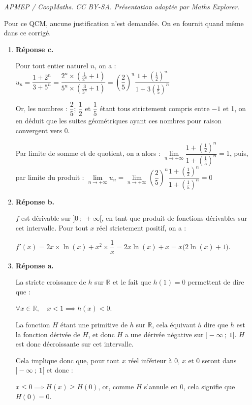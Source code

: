 \documentclass[10pt]{article}
\providecommand{\R}{\mathbb{R}}
\begin{document}
\noindent\textit{APMEP / CoopMaths. CC BY-SA. Présentation adaptée par Maths Explorer.}\par\medskip
\bigskip
Pour ce QCM, aucune justification n'est demandée. On en fournit quand même dans ce corrigé.
\begin{enumerate}
	\item \textbf{Réponse c.}

Pour tout entier naturel $n$, on a : $u_n = \dfrac{1 + 2^n}{3 + 5^n } = \dfrac{2^n \times \left(\frac{1}{2^n}+1\right)}{5^n\times \left(\frac{3}{5^n} + 1\right)  } = \left(\dfrac{2}{5}\right)^n \dfrac{1 + \left(\frac{1}{2}\right)^n}{1 + 3\left(\frac{1}{5}\right)^n}$

Or, les nombres : $ \dfrac{2}{5} $; $ \dfrac{1}{2} $ et $ \dfrac{1}{5} $ étant tous strictement compris entre $-1$ et 1, on en déduit que les suites géométriques ayant ces nombres pour raison convergent vers 0.

Par limite de somme et de quotient, on a alors : $ \lim\limits_{n \to +\infty} \dfrac{1 + \left(\frac{1}{2}\right)^n}{1 + \left(\frac{1}{5}\right)^n} = 1$, puis, par limite du produit : $\lim\limits_{n \to +\infty} u_n = \lim\limits_{n \to +\infty}  \left(\dfrac{2}{5}\right)^n \dfrac{1 + \left(\frac{1}{2}\right)^n}{1 + \left(\frac{1}{5}\right)^n}=0$

	\item \textbf{Réponse b.}

$f$ est dérivable sur $ ]0~;~+\infty[ $, en tant que produit de fonctions dérivables sur cet intervalle. Pour tout $x$ réel strictement positif, on a :

$f'(x) = 2x \times \ln(x) + x^2 \times \dfrac{1}{x} = 2x\ln(x) + x = x\big(2\ln(x) + 1\big) $.

	\item \textbf{Réponse a.}

La stricte croissance de $h$ sur $\R$ et le fait que $h(1) = 0$ permettent de dire que :

$\forall x \in \R, \quad x < 1 \implies h(x) < 0$.

La fonction $H$ étant une primitive de $h$ sur $\R$, cela équivaut à dire que $h$ est la fonction dérivée de $H$, et donc $H$ a une dérivée négative sur $ ]-\infty~;~1[ $. $H$ est donc décroissante sur cet intervalle.

Cela implique donc que, pour tout $x$ réel inférieur à 0, $x$ et $0$ seront dans $ ]-\infty~;~1[ $ et donc :

$x \leqslant 0 \implies H(x) \geqslant H(0)$, or, comme $H$ s'annule en 0, cela signifie que $H(0) = 0$.


\end{enumerate}
\end{document}
